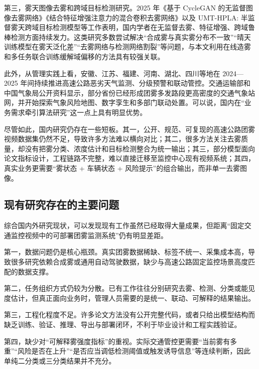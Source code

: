 第三，雾天图像去雾和跨域目标检测研究。2025 年《基于 CycleGAN 的无监督图像去雾网络》《结合特征增强注意力的混合卷积去雾网络》以及 UMT-HPLA: 半监督雾天跨域目标检测模型等工作表明，国内学者在无监督去雾、特征增强、跨域鲁棒检测方面持续发力\cite{cycleganDehaze2025,hybridConvDehaze2025,umtHpla2025}。这类研究多数尝试解决“合成雾与真实雾分布不一致”“晴天训练模型在雾天泛化差”“去雾网络与检测网络割裂”等问题，与本文利用在线造雾和多任务联合训练缓解域偏移的方法具有较强关联。

此外，从管理实践上看，安徽、江苏、福建、河南、湖北、四川等地在 2024—2025 年间持续推进高速公路恶劣天气监测、分级预警和联动管控。交通运输部和中国气象局公开资料显示，部分省份已经形成团雾多发路段更高密度的交通气象站网，并开始探索气象风险地图、数字孪生和多部门联动处置\cite{cmaRiskMap2025,cmaThreshold2025,chinaRoadWeatherReview}。可以说，国内在“业务需求牵引算法研究”这一点上具有明显优势。

尽管如此，国内研究仍存在一些短板。其一，公开、规范、可复现的高速公路团雾视频数据集仍然不足，导致许多方法难以横向对比；其二，很多方法关注去雾质量，却没有把雾分类、浓度估计和目标检测整合为统一输出；其三，部分模型面向论文指标设计，工程链路不完整，难以直接迁移至监控中心现有视频系统；其四，真实业务更需要“雾状态 + 车辆状态 + 风险提示”的组合输出，而非单一去雾图像。

\subsection{现有研究存在的主要问题}

综合国内外研究现状，可以发现现有工作虽然已经取得大量成果，但距离“固定交通监控视频中的可部署团雾监测系统”仍有明显差距。

第一，数据问题仍是核心瓶颈。真实团雾数据稀缺、标签不统一、采集成本高，导致很多研究依赖合成雾或通用自动驾驶数据，缺少与高速公路固定监控场景高度匹配的数据支撑\cite{uadetrac,umtHpla2025}。

第二，任务组织方式仍较为分散。已有工作往往分别研究去雾、检测、分类或能见度估计，但真正面向业务时，管理人员需要的是统一、联动、可解释的结果输出\cite{defogYolo2024,dehazingReasoningYolo2024,fogyolo2026}。

第三，工程化程度不足。许多论文方法没有公开完整代码，或者只给出模型结构而缺乏训练、验证、推理、导出与部署闭环，不利于毕业设计和工程实践验证。

第四，缺少对“可解释雾强度指标”的重视。实际交通管控更需要“当前雾有多重”“风险是否在上升”“是否应当调低检测阈值或触发诱导信息”等连续判断，因此单纯二分类或三分类结果并不充分\cite{sunxiao2024,koschmieder}。

